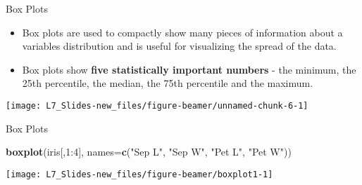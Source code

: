 \documentclass[ignorenonframetext,]{beamer}
\newenvironment{Shaded}{\begin{snugshade}}{\end{snugshade}}
\newcommand{\KeywordTok}[1]{\textcolor[rgb]{0.13,0.29,0.53}{\textbf{{#1}}}}
\newcommand{\DataTypeTok}[1]{\textcolor[rgb]{0.13,0.29,0.53}{{#1}}}
\newcommand{\DecValTok}[1]{\textcolor[rgb]{0.00,0.00,0.81}{{#1}}}
\newcommand{\StringTok}[1]{\textcolor[rgb]{0.31,0.60,0.02}{{#1}}}
\newcommand{\NormalTok}[1]{{#1}}
\begin{document}
\begin{frame}[fragile]{Box Plots}

\begin{itemize}
\item
  Box plots are used to compactly show many pieces of information about
  a variables distribution and is useful for visualizing the spread of
  the data.
\item
  Box plots show \textbf{five statistically important numbers} - the
  minimum, the 25th percentile, the median, the 75th percentile and the
  maximum.
\end{itemize}

\small

\begin{Shaded}
\end{Shaded}

\begin{center}\texttt{[image: L7\_Slides-new\_files/figure-beamer/unnamed-chunk-6-1]} \end{center}

\vfill

\end{frame}

\begin{frame}[fragile]{Box Plots}

\small

\begin{Shaded}
\begin{Highlighting}[]
\KeywordTok{boxplot}\NormalTok{(iris[,}\DecValTok{1}\NormalTok{:}\DecValTok{4}\NormalTok{], }
        \DataTypeTok{names=}\KeywordTok{c}\NormalTok{(}\StringTok{"Sep L"}\NormalTok{, }\StringTok{"Sep W"}\NormalTok{, }\StringTok{"Pet L"}\NormalTok{, }\StringTok{"Pet W"}\NormalTok{))}
\end{Highlighting}
\end{Shaded}

\begin{center}\texttt{[image: L7\_Slides-new\_files/figure-beamer/boxplot1-1]} \end{center}

\end{frame}
\end{document}
